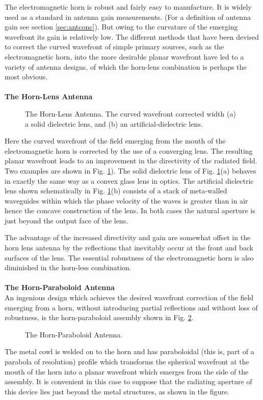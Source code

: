 The electromagnetic horn is robust and fairly easy to manufacture. It is widely used as a standard in antenna gain measurements. (For a definition of antenna gain see section \ref{sec:antconc}). But owing to the curvature of the emerging wavefront its gain is relatively low. The different methods that have been devised to correct the curved wavefront of simple primary sources, such as the electromagnetic horn, into the more desirable planar wavefront have led to a variety of antenna designs, of which the horn-lens combination is perhaps the most obvious.\\
\\
\textbf{The Horn-Lens Antenna}\\
\begin{figure}[htbp]
	\begin{center}
	\end{center}
	\caption{The Horn-Lens Antenna. The curved wavefront corrected width (a) a solid dielectric lens, and (b) an artificial-dielectric lens.}
	\label{fig:horn-lens}
\end{figure}
Here the curved wavefront of the field emerging from the mouth of the electromagnetic horn is corrected by the use of a converging lens. The resulting planar wavefront leads to an improvement in the directivity of the radiated field. Two examples are shown in Fig. \ref{fig:horn-lens}).
The solid dielectric lens of Fig. \ref{fig:horn-lens}(a) behaves in exactly the same way as a convex glass lens in optics. The artificial dielectric lens shown schematically in Fig. \ref{fig:horn-lens}(b) consists of a stack of meta-walled waveguides within which the phase velocity of the waves is greater than in air hence the concave construction of the lens. In both cases the natural aperture is just beyond the output face of the lens.

The advantage of the increased directivity and gain are somewhat offset in the horn lens antenna by the reflections that inevitably occur at the front and back surfaces of the lens. The essential robustness of the electromagnetic horn is also diminished in the horn-less combination.\\
\\
\textbf{The Horn-Paraboloid Antenna}\\
An ingenious design which achieves the desired wavefront correction of the field emerging from a horn, without introducing partial reflections and without loss of robustness, is the horn-paraboloid assembly shown in Fig. \ref{fig:horn-para}.
\begin{figure}[htbp]
	\begin{center}
	\end{center}
	\caption{The Horn-Paraboloid Antenna.}
	\label{fig:horn-para}
\end{figure}
The metal cowl is welded on to the horn and has paraboloidal (this is, part of a parabola of resolution) profile which transforms the spherical wavefront at the mouth of the horn into a planar wavefront which emerges from the side of the assembly. It is convenient in this case to suppose that the radiating aperture of this device lies just beyond the metal structures, as shown in the figure.

